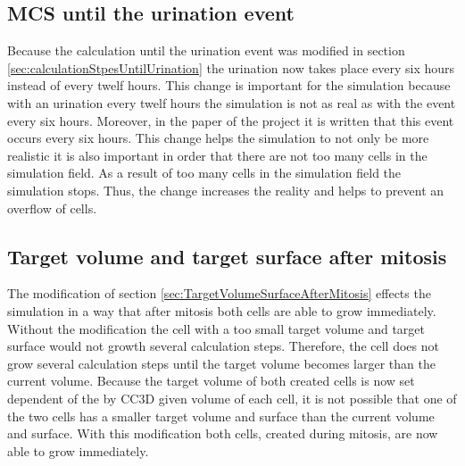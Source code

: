 \subsection{\ac{MCS} until the urination event}
Because the calculation until the urination event was modified in section \ref{sec:calculationStpesUntilUrination} the urination now takes place every six hours instead of every twelf hours. This change is important for the simulation because with an urination every twelf hours the simulation is not as real as with the event every six hours. Moreover, in the paper \cite{Torelli2017} of the project it is written that this event occurs every six hours. This change helps the simulation to not only be more realistic it is also important in order that there are not too many cells in the simulation field. As a result of too many cells in the simulation field the simulation stops. Thus, the change increases the reality and helps to prevent an overflow of cells.
\subsection{Target volume and target surface after mitosis}
The modification of section \ref{sec:TargetVolumeSurfaceAfterMitosis} effects the simulation in a way that after mitosis both cells are able to grow immediately. Without the modification the cell with a too small target volume and target surface would not growth several calculation steps. Therefore, the cell does not grow several calculation steps until the target volume becomes larger than the current volume. Because the target volume of both created cells is now set dependent of the by \ac{CC3D} given volume of each cell, it is not possible that one of the two cells has a smaller target volume and surface than the current volume and surface. With this modification both cells, created during mitosis, are now able to grow immediately.

